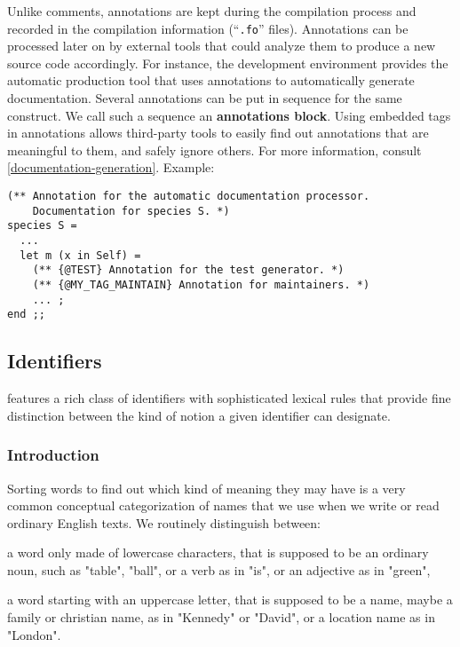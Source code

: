 Unlike comments, annotations are kept during the compilation process
and recorded in the compilation information (``{\tt .fo}'' files). Annotations can
be processed later on by external tools that could analyze them to
produce a new {\focal} source code accordingly.
For instance, the {\focal} development environment provides the {\focdoc}
automatic production tool that uses annotations to automatically generate
documentation.
Several annotations can be put in sequence for the same construct. We call
such a sequence an {\bf annotations block}.
Using embedded tags in annotations allows third-party tools to easily find
out annotations that are meaningful to them, and safely ignore others.
For more information, consult
\ref{documentation-generation}.
Example:
{\scriptsize
\begin{lstlisting}
(** Annotation for the automatic documentation processor.
    Documentation for species S. *)
species S =
  ...
  let m (x in Self) =
    (** {@TEST} Annotation for the test generator. *)
    (** {@MY_TAG_MAINTAIN} Annotation for maintainers. *)
    ... ;
end ;;
\end{lstlisting}
}

\subsection{Identifiers}
\vspace{0.2cm}

{\focal} features a rich class of identifiers with sophisticated lexical
rules that provide fine distinction between the kind of notion a given
identifier can designate.

\subsubsection{Introduction}

Sorting words to find out which kind of meaning they may have is a very common
conceptual categorization of names that we use when we write or read ordinary
English texts. We routinely distinguish between:
\begin{citemize}
\item a word only made of lowercase characters, that is supposed to be an
  ordinary noun, such as "table", "ball", or a verb as in "is", or an
  adjective as in "green",
\item a word starting with an uppercase letter, that is supposed to be a name,
  maybe a family or christian name, as in "Kennedy" or "David", or a location
  name as in "London".
\end{citemize}

